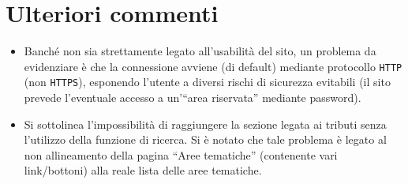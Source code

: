 \section{Ulteriori commenti}

\begin{itemize}
    \item Banché non sia strettamente legato all'usabilità del sito, un problema
          da evidenziare è che la connessione avviene (di default) mediante
          protocollo \texttt{HTTP} (non \texttt{HTTPS}), esponendo l'utente a
          diversi rischi di sicurezza evitabili (il sito prevede l'eventuale
          accesso a un'``area riservata'' mediante password).
    \item Si sottolinea l'impossibilità di raggiungere la sezione legata ai
          tributi senza l'utilizzo della funzione di ricerca. Si è notato che
          tale problema è legato al non allineamento della pagina ``Aree
          tematiche'' (contenente vari link/bottoni) alla reale lista delle aree
          tematiche.
\end{itemize}
